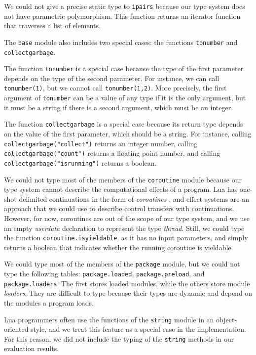 We could not give a precise static type to \texttt{ipairs}
because our type system does not have parametric polymorphism.
This function returns an iterator function that traverses a
list of elements.

The \texttt{base} module also includes two special cases:
the functions \texttt{tonumber} and \texttt{collectgarbage}.

The function \texttt{tonumber} is a special case because the
type of the first parameter depends on the type of the
second parameter.
For instance, we can call \texttt{tonumber(1)}, but we cannot
call \texttt{tonumber(1,2)}.
More precisely, the first argument of \texttt{tonumber} can be
a value of any type if it is the only argument, but it must
be a string if there is a second argument,
which must be an integer.

The function \texttt{collectgarbage} is a special case because
its return type depends on the value of the first parameter,
which should be a string.
For instance, calling \texttt{collectgarbage("collect")} returns an integer number,
calling \texttt{collectgarbage("count")} returns a floating point number,
and calling \texttt{collectgarbage("isrunning")} returns a boolean.

We could not type most of the members of the \texttt{coroutine} module
because our type system cannot describe the computational effects of a program.
Lua has one-shot delimited continuations \citep{james2011yield}
in the form of \emph{coroutines} \citep{moura2009rc}, and
effect systems \citep{nielson1999type} are an approach that we
could use to describe control transfers with continuations.
However, for now, coroutines are out of the scope of our type
system, and we use an empty \emph{userdata} declaration
to represent the type \emph{thread}.
Still, we could type the function \texttt{coroutine.isyieldable},
as it has no input parameters, and simply returns a boolean that
indicates whether the running coroutine is yieldable.

We could type most of the members of the \texttt{package} module,
but we could not type the following tables: \texttt{package.loaded},
\texttt{package.preload}, and \texttt{package.loaders}.
The first stores loaded modules, while the others store module \emph{loaders}.
They are difficult to type because their types are dynamic and
depend on the modules a program loads.

Lua programmers often use the functions of the \texttt{string} module
in an object-oriented style, and we treat this feature as a
special case in the implementation.
For this reason, we did not include the typing of the \texttt{string}
methods in our evaluation results.

